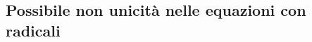\subsection{Possibile non unicità nelle equazioni con radicali}
\label{sec:esercizi-equazioni-differenziali-non-unicita-con-radicali}
